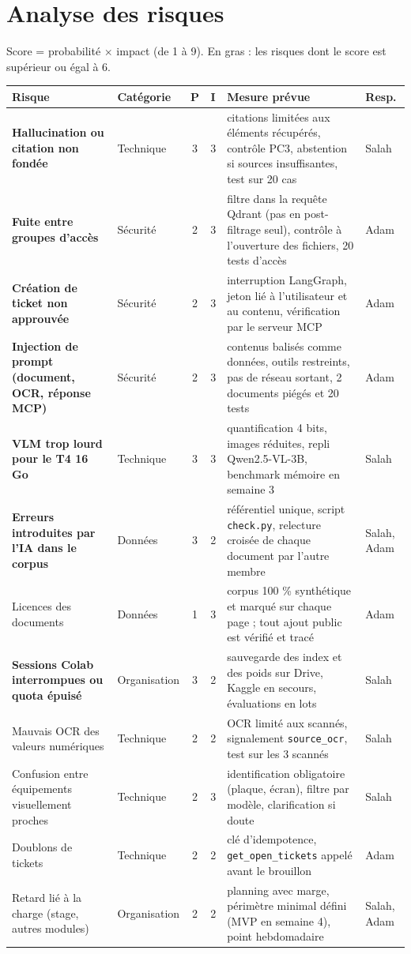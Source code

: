 \documentclass[11pt,a4paper]{article}
\begin{document}
\section{Analyse des risques}
Score = probabilité $\times$ impact (de 1 à 9). En gras : les risques dont le score est supérieur ou égal à 6.
\begin{center}\small
\begin{longtable}{L{3.4cm}L{1.6cm}ccL{6.0cm}L{1.6cm}}
\toprule
\textbf{Risque} & \textbf{Catégorie} & \textbf{P} & \textbf{I} & \textbf{Mesure prévue} & \textbf{Resp.}\\\midrule\endhead
\textbf{Hallucination ou citation non fondée} & Technique & 3 & 3 & citations limitées aux éléments récupérés, contrôle PC3, abstention si sources insuffisantes, test sur 20 cas & Salah\\
\textbf{Fuite entre groupes d'accès} & Sécurité & 2 & 3 & filtre dans la requête Qdrant (pas en post-filtrage seul), contrôle à l'ouverture des fichiers, 20 tests d'accès & Adam\\
\textbf{Création de ticket non approuvée} & Sécurité & 2 & 3 & interruption LangGraph, jeton lié à l'utilisateur et au contenu, vérification par le serveur MCP & Adam\\
\textbf{Injection de prompt (document, OCR, réponse MCP)} & Sécurité & 2 & 3 & contenus balisés comme données, outils restreints, pas de réseau sortant, 2 documents piégés et 20 tests & Adam\\
\textbf{VLM trop lourd pour le T4 16 Go} & Technique & 3 & 3 & quantification 4 bits, images réduites, repli Qwen2.5-VL-3B, benchmark mémoire en semaine 3 & Salah\\
\textbf{Erreurs introduites par l'IA dans le corpus} & Données & 3 & 2 & référentiel unique, script \texttt{check.py}, relecture croisée de chaque document par l'autre membre & Salah, Adam\\
Licences des documents & Données & 1 & 3 & corpus 100 \% synthétique et marqué sur chaque page ; tout ajout public est vérifié et tracé & Adam\\
\textbf{Sessions Colab interrompues ou quota épuisé} & Organisation & 3 & 2 & sauvegarde des index et des poids sur Drive, Kaggle en secours, évaluations en lots & Salah\\
Mauvais OCR des valeurs numériques & Technique & 2 & 2 & OCR limité aux scannés, signalement \texttt{source\_ocr}, test sur les 3 scannés & Salah\\
Confusion entre équipements visuellement proches & Technique & 2 & 3 & identification obligatoire (plaque, écran), filtre par modèle, clarification si doute & Salah\\
Doublons de tickets & Technique & 2 & 2 & clé d'idempotence, \texttt{get\_open\_tickets} appelé avant le brouillon & Adam\\
Retard lié à la charge (stage, autres modules) & Organisation & 2 & 2 & planning avec marge, périmètre minimal défini (MVP en semaine 4), point hebdomadaire & Salah, Adam\\
\bottomrule
\end{longtable}
\end{center}
\end{document}
